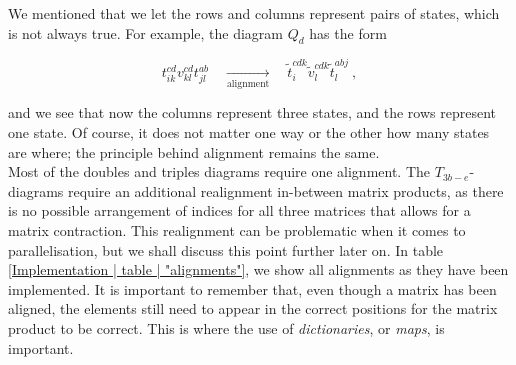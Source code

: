 \documentclass[10pt,twoside]{report}
\begin{document}
	We mentioned that we let the rows and columns represent pairs of states, which is not always true. For example, the diagram $Q_d$ has the form
	
	\begin{equation}
		t_{ik}^{cd}v_{kl}^{cd}t_{jl}^{ab} \quad\underset{\text{alignment}}{\longrightarrow}\quad \tilde{t}_{i}^{cdk}\tilde{v}_{l}^{cdk}\tilde{t}_{l}^{abj}\:,
	\end{equation}
	
	and we see that now the columns represent three states, and the rows represent one state. Of course, it does not matter one way or the other how many states are where; the principle behind alignment remains the same.\\
	
	Most of the doubles and triples diagrams require one alignment. The $T_{3b-e}$-diagrams require an additional realignment in-between matrix products, as there is no possible arrangement of indices for all three matrices that allows for a matrix contraction. This realignment can be problematic when it comes to parallelisation, but we shall discuss this point further later on. In table \ref{Implementation | table | "alignments"}, we show all alignments as they have been implemented. It is important to remember that, even though a matrix has been aligned, the elements still need to appear in the correct positions for the matrix product to be correct. This is where the use of \emph{dictionaries}, or \emph{maps}, is important.\\
	
\end{document}
